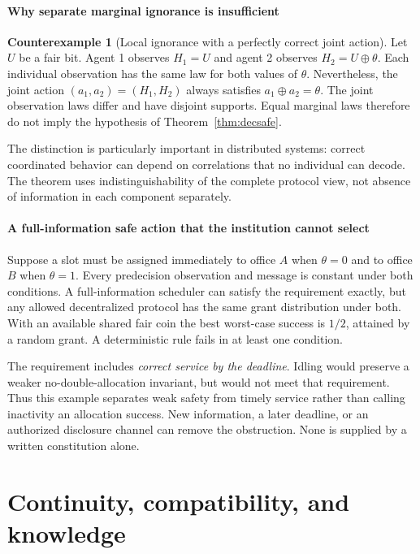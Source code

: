 \documentclass[11pt,letterpaper]{article}
\theoremstyle{plain}
\theoremstyle{definition}
\newtheorem{counterexample}[proposition]{Counterexample}
\theoremstyle{remark}
\begin{document}
\subsection{Why separate marginal ignorance is insufficient}
\begin{counterexample}[Local ignorance with a perfectly correct joint action]\label{ex:jointviews}
Let $U$ be a fair bit. Agent 1 observes $H_1=U$ and agent 2 observes $H_2=U\oplus\theta$. Each individual observation has the same law for both values of $\theta$. Nevertheless, the joint action $(a_1,a_2)=(H_1,H_2)$ always satisfies $a_1\oplus a_2=\theta$. The joint observation laws differ and have disjoint supports. Equal marginal laws therefore do not imply the hypothesis of Theorem~\ref{thm:decsafe}.
\end{counterexample}

The distinction is particularly important in distributed systems: correct coordinated behavior can depend on correlations that no individual can decode. The theorem uses indistinguishability of the complete protocol view, not absence of information in each component separately.

\subsection{A full-information safe action that the institution cannot select}
Suppose a slot must be assigned immediately to office $A$ when $\theta=0$ and to office $B$ when $\theta=1$. Every predecision observation and message is constant under both conditions. A full-information scheduler can satisfy the requirement exactly, but any allowed decentralized protocol has the same grant distribution under both. With an available shared fair coin the best worst-case success is $1/2$, attained by a random grant. A deterministic rule fails in at least one condition.

The requirement includes \emph{correct service by the deadline}. Idling would preserve a weaker no-double-allocation invariant, but would not meet that requirement. Thus this example separates weak safety from timely service rather than calling inactivity an allocation success. New information, a later deadline, or an authorized disclosure channel can remove the obstruction. None is supplied by a written constitution alone.


\clearpage\part{Continuity, compatibility, and knowledge}
\end{document}
